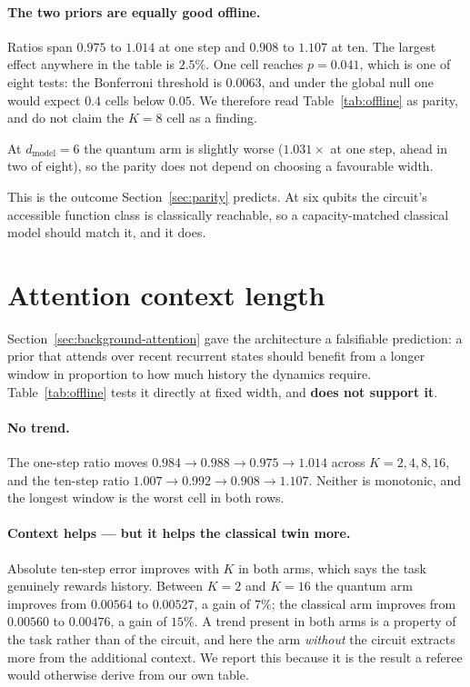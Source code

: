 \documentclass[11pt,onecolumn]{article}
\begin{document}
\paragraph{The two priors are equally good offline.}
Ratios span $0.975$ to $1.014$ at one step and $0.908$ to $1.107$ at ten.
The largest effect anywhere in the table is $2.5\%$. One cell reaches
$p = 0.041$, which is one of eight tests: the Bonferroni threshold is
$0.0063$, and under the global null one would expect $0.4$ cells below
$0.05$. We therefore read Table~\ref{tab:offline} as parity, and do not
claim the $K = 8$ cell as a finding.

At $d_{\mathrm{model}} = 6$ the quantum arm is slightly worse
($1.031\times$ at one step, ahead in two of eight), so the parity does
not depend on choosing a favourable width.

This is the outcome Section~\ref{sec:parity} predicts. At six qubits the
circuit's accessible function class is classically reachable, so a
capacity-matched classical model should match it, and it does.

\section{Attention context length}\label{sec:context}
Section~\ref{sec:background-attention} gave the architecture a
falsifiable prediction: a prior that attends over recent recurrent
states should benefit from a longer window in proportion to how much
history the dynamics require. Table~\ref{tab:offline} tests it directly
at fixed width, and \textbf{does not support it}.

\paragraph{No trend.}
The one-step ratio moves $0.984 \to 0.988 \to 0.975 \to 1.014$ across
$K = 2, 4, 8, 16$, and the ten-step ratio
$1.007 \to 0.992 \to 0.908 \to 1.107$. Neither is monotonic, and the
longest window is the worst cell in both rows.

\paragraph{Context helps --- but it helps the classical twin more.}
Absolute ten-step error improves with $K$ in both arms, which says the
task genuinely rewards history. Between $K = 2$ and $K = 16$ the quantum
arm improves from $0.00564$ to $0.00527$, a gain of $7\%$; the classical
arm improves from $0.00560$ to $0.00476$, a gain of $15\%$. A trend
present in both arms is a property of the task rather than of the
circuit, and here the arm \emph{without} the circuit extracts more from
the additional context. We report this because it is the result a
referee would otherwise derive from our own table.
\end{document}
